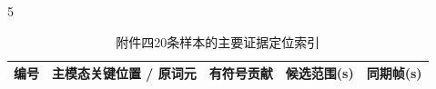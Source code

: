 \begin{PaperTable}{5}

\begin{table}[!htbp]
\centering\caption{附件四20条样本的主要证据定位索引\label{q3-tab16}}
\begin{tabular}{@{}lllll@{}}
\toprule
\begin{minipage}[b]{\dimexpr 0.070000\linewidth-0.560000\tabcolsep\relax}\raggedleft
编号\strut
\end{minipage} & \begin{minipage}[b]{\dimexpr 0.340000\linewidth-2.720000\tabcolsep\relax}\raggedright
主模态关键位置 / 原词元\strut
\end{minipage} & \begin{minipage}[b]{\dimexpr 0.160000\linewidth-1.280000\tabcolsep\relax}\raggedleft
有符号贡献\strut
\end{minipage} & \begin{minipage}[b]{\dimexpr 0.280000\linewidth-2.240000\tabcolsep\relax}\raggedright
候选范围(s)\strut
\end{minipage} & \begin{minipage}[b]{\dimexpr 0.150000\linewidth-1.200000\tabcolsep\relax}\raggedleft
同期帧(s)\strut
\end{minipage}\tabularnewline
\midrule


\end{tabular}
\end{table}
\end{PaperTable}
